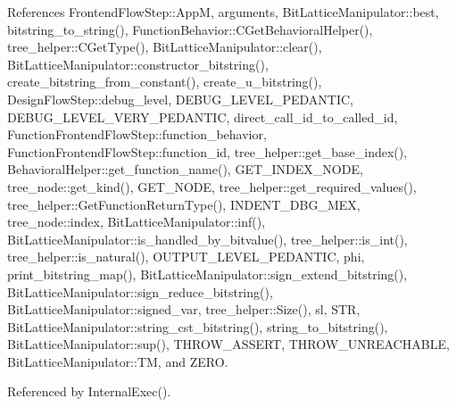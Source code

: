 References Frontend\+Flow\+Step\+::\+AppM, arguments, Bit\+Lattice\+Manipulator\+::best, bitstring\+\_\+to\+\_\+string(), Function\+Behavior\+::\+C\+Get\+Behavioral\+Helper(), tree\+\_\+helper\+::\+C\+Get\+Type(), Bit\+Lattice\+Manipulator\+::clear(), Bit\+Lattice\+Manipulator\+::constructor\+\_\+bitstring(), create\+\_\+bitstring\+\_\+from\+\_\+constant(), create\+\_\+u\+\_\+bitstring(), Design\+Flow\+Step\+::debug\+\_\+level, D\+E\+B\+U\+G\+\_\+\+L\+E\+V\+E\+L\+\_\+\+P\+E\+D\+A\+N\+T\+IC, D\+E\+B\+U\+G\+\_\+\+L\+E\+V\+E\+L\+\_\+\+V\+E\+R\+Y\+\_\+\+P\+E\+D\+A\+N\+T\+IC, direct\+\_\+call\+\_\+id\+\_\+to\+\_\+called\+\_\+id, Function\+Frontend\+Flow\+Step\+::function\+\_\+behavior, Function\+Frontend\+Flow\+Step\+::function\+\_\+id, tree\+\_\+helper\+::get\+\_\+base\+\_\+index(), Behavioral\+Helper\+::get\+\_\+function\+\_\+name(), G\+E\+T\+\_\+\+I\+N\+D\+E\+X\+\_\+\+N\+O\+DE, tree\+\_\+node\+::get\+\_\+kind(), G\+E\+T\+\_\+\+N\+O\+DE, tree\+\_\+helper\+::get\+\_\+required\+\_\+values(), tree\+\_\+helper\+::\+Get\+Function\+Return\+Type(), I\+N\+D\+E\+N\+T\+\_\+\+D\+B\+G\+\_\+\+M\+EX, tree\+\_\+node\+::index, Bit\+Lattice\+Manipulator\+::inf(), Bit\+Lattice\+Manipulator\+::is\+\_\+handled\+\_\+by\+\_\+bitvalue(), tree\+\_\+helper\+::is\+\_\+int(), tree\+\_\+helper\+::is\+\_\+natural(), O\+U\+T\+P\+U\+T\+\_\+\+L\+E\+V\+E\+L\+\_\+\+P\+E\+D\+A\+N\+T\+IC, phi, print\+\_\+bitstring\+\_\+map(), Bit\+Lattice\+Manipulator\+::sign\+\_\+extend\+\_\+bitstring(), Bit\+Lattice\+Manipulator\+::sign\+\_\+reduce\+\_\+bitstring(), Bit\+Lattice\+Manipulator\+::signed\+\_\+var, tree\+\_\+helper\+::\+Size(), sl, S\+TR, Bit\+Lattice\+Manipulator\+::string\+\_\+cst\+\_\+bitstring(), string\+\_\+to\+\_\+bitstring(), Bit\+Lattice\+Manipulator\+::sup(), T\+H\+R\+O\+W\+\_\+\+A\+S\+S\+E\+RT, T\+H\+R\+O\+W\+\_\+\+U\+N\+R\+E\+A\+C\+H\+A\+B\+LE, Bit\+Lattice\+Manipulator\+::\+TM, and Z\+E\+RO.



Referenced by Internal\+Exec().

